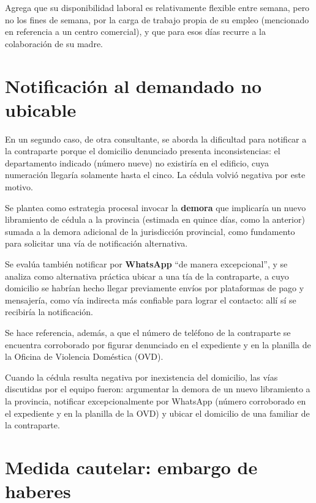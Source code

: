 \documentclass[12pt,oneside]{book}
\begin{document}
Agrega que su disponibilidad laboral es relativamente flexible entre semana, pero no los fines de semana, por la carga de trabajo propia de su empleo (mencionado en referencia a un centro comercial), y que para esos d\'ias recurre a la colaboraci\'on de su madre.

\section{Notificaci\'on al demandado no ubicable}

En un segundo caso, de otra consultante, se aborda la dificultad para notificar a la contraparte porque el domicilio denunciado presenta inconsistencias: el departamento indicado (n\'umero nueve) no existir\'ia en el edificio, cuya numeraci\'on llegar\'ia solamente hasta el cinco. La c\'edula volvi\'o negativa por este motivo.

Se plantea como estrategia procesal invocar la \textbf{demora} que implicar\'ia un nuevo libramiento de c\'edula a la provincia (estimada en quince d\'ias, como la anterior) sumada a la demora adicional de la jurisdicci\'on provincial, como fundamento para solicitar una v\'ia de notificaci\'on alternativa.

Se eval\'ua tambi\'en notificar por \textbf{WhatsApp} ``de manera excepcional'', y se analiza como alternativa pr\'actica ubicar a una t\'ia de la contraparte, a cuyo domicilio se habr\'ian hecho llegar previamente env\'ios por plataformas de pago y mensajer\'ia, como v\'ia indirecta m\'as confiable para lograr el contacto: all\'i s\'i se recibir\'ia la notificaci\'on.

Se hace referencia, adem\'as, a que el n\'umero de tel\'efono de la contraparte se encuentra corroborado por figurar denunciado en el expediente y en la planilla de la Oficina de Violencia Dom\'estica (OVD).

\begin{important}
Cuando la c\'edula resulta negativa por inexistencia del domicilio, las v\'ias discutidas por el equipo fueron: argumentar la demora de un nuevo libramiento a la provincia, notificar excepcionalmente por WhatsApp (n\'umero corroborado en el expediente y en la planilla de la OVD) y ubicar el domicilio de una familiar de la contraparte.
\end{important}

\section{Medida cautelar: embargo de haberes}
\end{document}
